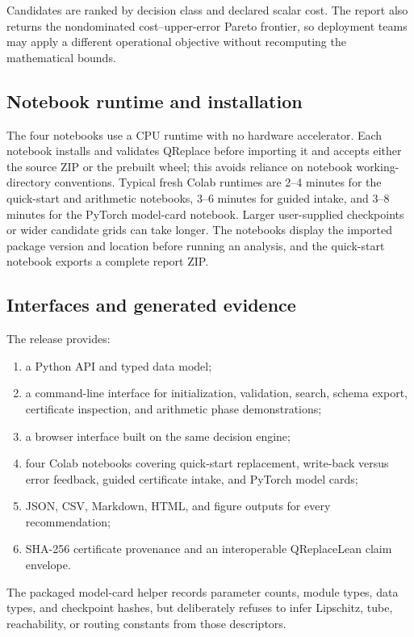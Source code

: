 \documentclass[twoside,11pt]{article}
\begin{document}
Candidates are ranked by decision class and declared scalar cost.  The report
also returns the nondominated cost--upper-error Pareto frontier, so deployment
teams may apply a different operational objective without recomputing the
mathematical bounds.

\subsection{Notebook runtime and installation}
\label{app:qreplace-runtime}

The four notebooks use a CPU runtime with no hardware accelerator.  Each
notebook installs and validates QReplace before importing it and accepts
either the source ZIP or the prebuilt wheel; this avoids reliance on notebook
working-directory conventions.  Typical fresh Colab runtimes are 2--4 minutes
for the quick-start and arithmetic notebooks, 3--6 minutes for guided intake,
and 3--8 minutes for the PyTorch model-card notebook.  Larger user-supplied
checkpoints or wider candidate grids can take longer.  The notebooks display
the imported package version and location before running an analysis, and the
quick-start notebook exports a complete report ZIP.

\subsection{Interfaces and generated evidence}
\label{app:qreplace-interfaces}

The release provides:
\begin{enumerate}[leftmargin=1.75em,itemsep=.25em]
\item a Python API and typed data model;
\item a command-line interface for initialization, validation, search, schema
      export, certificate inspection, and arithmetic phase demonstrations;
\item a browser interface built on the same decision engine;
\item four Colab notebooks covering quick-start replacement, write-back versus
      error feedback, guided certificate intake, and PyTorch model cards;
\item JSON, CSV, Markdown, HTML, and figure outputs for every recommendation;
\item SHA-256 certificate provenance and an interoperable QReplaceLean claim
      envelope.
\end{enumerate}
The packaged model-card helper records parameter counts, module types, data
types, and checkpoint hashes, but deliberately refuses to infer Lipschitz,
tube, reachability, or routing constants from those descriptors.
\end{document}
